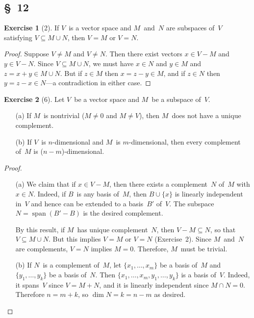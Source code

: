 \documentclass[letterpaper,12pt]{article}
\newcommand{\union}{\cup}
\newcommand{\sect}{\cap}
\DeclareMathOperator{\spn}{span}
\theoremstyle{definition}
\newtheorem*{exer}{Exercise}
\theoremstyle{remark}
\theoremstyle{direction}
\begin{document}
\subsection*{\S~12}
\begin{exer}[2]
If \(V\)~is a vector space and \(M\)~and~\(N\) are subspaces of~\(V\) satisfying \(V\subseteq M\union N\), then \(V=M\) or \(V=N\).
\end{exer}
\begin{proof}
Suppose \(V\ne M\) and \(V\ne N\). Then there exist vectors \(x\in V-M\) and \(y\in V-N\). Since \(V\subseteq M\union N\), we must have \(x\in N\) and \(y\in M\) and \(z=x+y\in M\union N\). But if \(z\in M\) then \(x=z-y\in M\), and if \(z\in N\) then \(y=z-x\in N\)---a contradiction in either case.
\end{proof}

\begin{exer}[6]
Let \(V\)~be a vector space and \(M\)~be a subspace of~\(V\).
\begin{enumerate}
\item[(a)] If \(M\)~is nontrivial (\(M\ne0\) and \(M\ne V\)), then \(M\)~does not have a unique complement.
\item[(b)] If \(V\)~is \(n\)-dimensional and \(M\)~is \(m\)-dimensional, then every complement of~\(M\) is (\(n-m\))-dimensional.
\end{enumerate}
\end{exer}
\begin{proof}\
\begin{enumerate}
\item[(a)] We claim that if \(x\in V-M\), then there exists a complement~\(N\) of~\(M\) with \(x\in N\). Indeed, if \(B\)~is any basis of~\(M\), then \(B\union\{x\}\) is linearly independent in~\(V\) and hence can be extended to a basis~\(B'\) of~\(V\). The subspace \(N=\spn(B'-B)\) is the desired complement.

By this result, if \(M\)~has unique complement~\(N\), then \(V-M\subseteq N\), so that \(V\subseteq M\union N\). But this implies \(V=M\) or \(V=N\) (Exercise~2). Since \(M\)~and~\(N\) are complements, \(V=N\) implies \(M=0\). Therefore, \(M\)~must be trivial.
\item[(b)]
If \(N\)~is a complement of~\(M\), let \(\{x_1,\ldots,x_m\}\) be a basis of~\(M\) and \(\{y_1,\ldots,y_k\}\) be a basis of~\(N\). Then \(\{x_1,\ldots,x_m,y_1,\ldots,y_k\}\) is a basis of~\(V\). Indeed, it spans~\(V\) since \(V=M+N\), and it is linearly independent since \(M\sect N=0\). Therefore \(n=m+k\), so \(\dim N=k=n-m\) as desired.\qedhere
\end{enumerate}
\end{proof}
\end{document}
